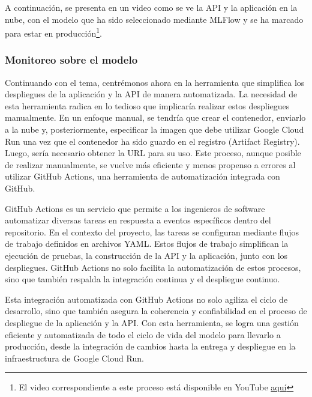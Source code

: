 A continuación, se presenta en un video como se ve la API y la aplicación en la nube, con el modelo que ha sido seleccionado mediante MLFlow y se ha marcado para estar en producción\footnote{El video correspondiente a este proceso está disponible en YouTube \href{https://youtu.be/GV5-WZFxAOU?si=juse0Gmu4mX00cAJ}{aquí}}.

\newpage

\subsubsection{Monitoreo sobre el modelo}

Continuando con el tema, centrémonos ahora en la herramienta que simplifica los despliegues de la aplicación y la API de manera automatizada. La necesidad de esta herramienta radica en lo tedioso que implicaría realizar estos despliegues manualmente. En un enfoque manual, se tendría que crear el contenedor, enviarlo a la nube y, posteriormente, especificar la imagen que debe utilizar Google Cloud Run una vez que el contenedor ha sido guardo en el registro (Artifact Registry). Luego, sería necesario obtener la URL para su uso. Este proceso, aunque posible de realizar manualmente, se vuelve más eficiente y menos propenso a errores al utilizar GitHub Actions, una herramienta de automatización integrada con GitHub. \newline

GitHub Actions es un servicio que permite a los ingenieros de software automatizar diversas tareas en respuesta a eventos específicos dentro del repositorio. En el contexto del proyecto, las tareas se configuran mediante flujos de trabajo definidos en archivos YAML. Estos flujos de trabajo simplifican la ejecución de pruebas, la construcción de la API y la aplicación, junto con los despliegues. GitHub Actions no solo facilita la automatización de estos procesos, sino que también respalda la integración continua y el despliegue continuo. \newline

Esta integración automatizada con GitHub Actions no solo agiliza el ciclo de desarrollo, sino que también asegura la coherencia y confiabilidad en el proceso de despliegue de la aplicación y la API. Con esta herramienta, se logra una gestión eficiente y automatizada de todo el ciclo de vida del modelo para llevarlo a producción, desde la integración de cambios hasta la entrega y despliegue en la infraestructura de Google Cloud Run. \newline

